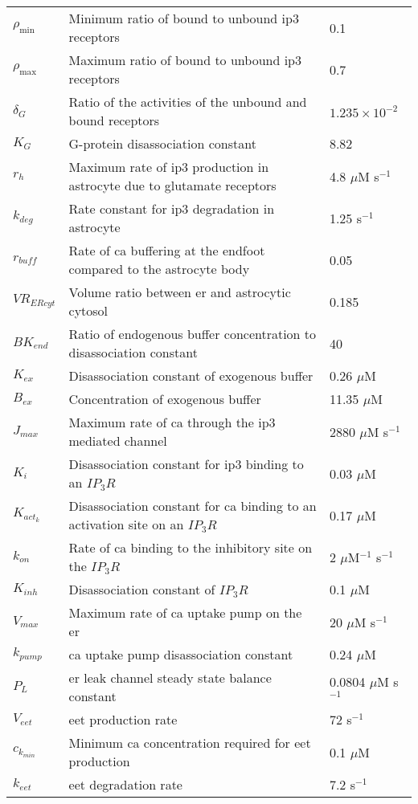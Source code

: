 \documentclass[11pt]{elsarticle}
\newcommand{\mus}{$\mu$M s$^{-1}$\xspace}
\newcommand{\uM}{$\mu$M\xspace}
\newcommand{\n}{$^{-1}$\xspace}
\newcommand{\e}[1]{\times 10^{#1}}
\newcommand{\psec}{s$^{-1}$\xspace}
\newcommand{\ca}{\gls{ca}\xspace}
\newcommand{\ip}{\gls{ip3}\xspace}
\begin{document}
\begin{longtable}[h!]{ p{0.1\linewidth}   p{0.68\linewidth}   p{0.22\linewidth} }
$\rho_{\text{min}}$ & Minimum ratio of bound to unbound \ip receptors  & 0.1  \\
$\rho_{\text{max}}$ & Maximum ratio of bound to unbound \ip receptors  & 0.7 \\
$\delta_G$ & Ratio of the activities of the unbound and bound receptors & $1.235 \e{-2}$ \\
$K_G$ & G-protein disassociation constant &  8.82 \\
$r_h$ & Maximum rate of \ip production in astrocyte due to glutamate receptors & 4.8 $\mu$M \psec  \\
$k_{deg}$ & Rate constant for \ip degradation in astrocyte  & 1.25 \psec  \\
$r_{buff}$ & Rate of \ca buffering at the endfoot compared to the astrocyte body  & 0.05  \\
$VR_{ERcyt}$ & Volume ratio between \gls{er} and astrocytic cytosol  & 0.185  \\
$BK_{end}$ & Ratio of endogenous buffer concentration to disassociation constant  & 40  \\
$K_{ex}$& Disassociation constant of exogenous buffer & 0.26 \uM  \\
$B_{ex}$& Concentration of exogenous buffer  & 11.35 \uM  \\
$J_{max}$ & Maximum rate of \ca through the \ip mediated channel  & 2880 \mus \\
$K_i$& Disassociation constant for \ip binding to an $IP_3R$  & 0.03 \uM  \\
$K_{act_k}$ & Disassociation constant for \ca binding to an activation site on an $IP_3R$  & 0.17 \uM \\
$k_{on}$ & Rate of \ca binding to the inhibitory site on the $IP_3R$  & 2 \uM\n \psec \\
$K_{inh}$ & Disassociation constant of $IP_3R$ & 0.1 \uM   \\
$V_{max}$ & Maximum rate of \ca uptake pump on the \gls{er}  & 20 \mus  \\
$k_{pump}$ & \ca uptake pump disassociation constant  & 0.24 \uM  \\
$P_L$ & \Gls{er} leak channel steady state balance constant  & 0.0804 \uM \psec \\			
$V_{eet}$& \Gls{eet} production rate & 72 \psec  \\
$c_{k_{min}}$& Minimum \ca concentration required for \gls{eet} production  & 0.1 \uM \\
$k_{eet}$ & \gls{eet} degradation rate  & 7.2 \psec  \\

\end{longtable}
\end{document}
